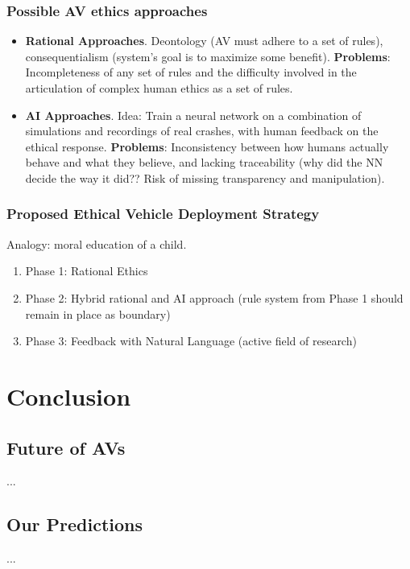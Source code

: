\documentclass[11pt]{article}
\begin{document}
\subsubsection{Possible AV ethics approaches}

\begin{itemize}
\item \textbf{Rational Approaches}. Deontology (AV must adhere to a set of rules), consequentialism (system's goal is to maximize some benefit). \textbf{Problems}: Incompleteness of any set of rules and the difficulty involved in the articulation of complex human ethics as a set of rules.
\item \textbf{AI Approaches}. Idea: Train a neural network on a combination of simulations and recordings of real crashes, with human feedback on the ethical response. \textbf{Problems}: Inconsistency between how humans actually behave and what they believe, and lacking traceability (why did the NN decide the way it did?? Risk of missing transparency and manipulation).
\end{itemize}

\subsubsection{Proposed Ethical Vehicle Deployment Strategy}
Analogy: moral education of a child.
\begin{enumerate}
\item Phase 1: Rational Ethics
\item Phase 2: Hybrid rational and AI approach (rule system from Phase 1 should remain in place as boundary)
\item Phase 3: Feedback with Natural Language (active field of research)
\end{enumerate}

\section{Conclusion}
\subsection{Future of AVs}
...
\subsection{Our Predictions}
...


%
%
\end{document}
